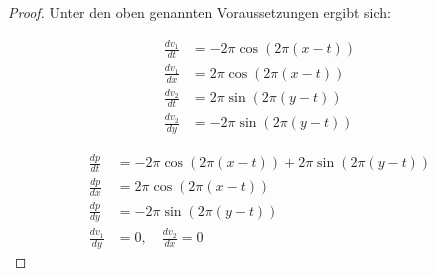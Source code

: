 \begin{proof}
Unter den oben genannten Voraussetzungen ergibt sich:

\begin{minipage}[t]{0.5\textwidth}
\begin{align*}
\frac{dv_1}{dt}&=-2\pi \cos(2\pi(x-t)) \\
\frac{dv_1}{dx}&=2\pi \cos(2\pi(x-t)) \\
\frac{dv_2}{dt}&=2\pi \sin(2\pi(y-t)) \\
\frac{dv_2}{dy}&=-2\pi \sin(2\pi(y-t))
\end{align*}
\end{minipage}
\begin{minipage}[t]{0.5\textwidth}
\begin{align*}
\frac{dp}{dt}&=-2\pi \cos(2\pi(x-t))+2\pi \sin(2\pi(y-t)) \\
\frac{dp}{dx}&=2\pi \cos(2\pi(x-t)) \\
\frac{dp}{dy}&=-2\pi \sin(2\pi(y-t)) \\
\frac{dv_1}{dy}&=0,\quad\frac{dv_2}{dx}=0
\end{align*}
\end{minipage}


\end{proof}
